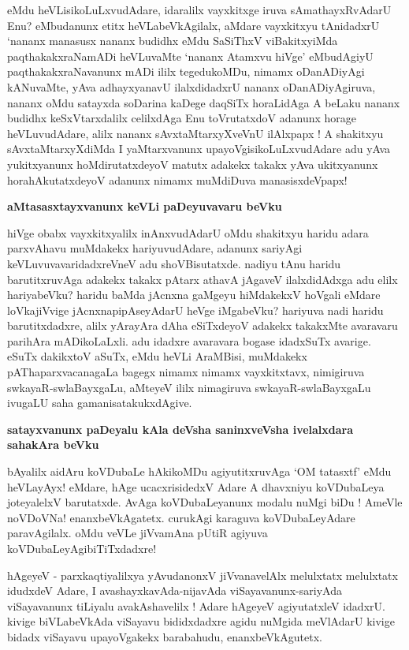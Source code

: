 \noindent
eMdu heVLisikoLuLxvudAdare, idaralilx vayxkitxge iruva sAmathayxRvAdarU 
Enu? eMbudanunx etitx heVLabeVkAgilalx, aMdare vayxkitxyu tAnidadxrU 
`nananx manasusx nananx budidhx eMdu SaSiThxV viBakitxyiMda 
paqthakakxraNamADi heVLuvaMte `nananx Atamxvu hiVge' eMbudAgiyU 
paqthakakxraNavanunx mADi ililx tegedukoMDu, nimamx oDanADiyAgi 
kANuvaMte, yAva adhayxyanavU ilalxdidadxrU nananx oDanADiyAgiruva, 
nananx oMdu satayxda soDarina kaDege daqSiTx horaLidAga A beLaku nananx budidhx keSxVtarxdalilx celilxdAga Enu toVrutatxdoV adanunx horage heVLuvudAdare, alilx nananx sAvxtaMtarxyXveVnU ilAlxpapx ! A shakitxyu sAvxtaMtarxyXdiMda I yaMtarxvanunx upayoVgisikoLuLxvudAdare adu yAva yukitxyanunx hoMdirutatxdeyoV matutx adakekx takakx yAva ukitxyanunx horahAkutatxdeyoV adanunx nimamx muMdiDuva manasisxdeVpapx!

{\bigskip
\noindent
{\large\bf aMtasasxtayxvanunx keVLi paDeyuvavaru beVku}}\label{page108a}
\medskip

\noindent
hiVge obabx vayxkitxyalilx inAnxvudAdarU oMdu shakitxyu haridu adara parxvAhavu muMdakekx hariyuvudAdare, adanunx sariyAgi keVLuvuvavaridadxreVneV adu shoVBisutatxde. nadiyu tAnu haridu barutitxruvAga adakekx takakx pAtarx athavA jAgaveV ilalxdidAdxga adu elilx hariyabeVku? haridu baMda jAcnxna gaMgeyu hiMdakekxV hoVgali eMdare loVkajiVvige jAcnxnapipAseyAdarU heVge iMgabeVku? hariyuva nadi haridu barutitxdadxre, alilx yArayAra dAha eSiTxdeyoV adakekx takakxMte avaravaru parihAra mADikoLaLxli. adu idadxre avaravara bogase idadxSuTx avarige. eSuTx dakikxtoV aSuTx, eMdu heVLi AraMBisi, muMdakekx pAThaparxvacanagaLa bagegx nimamx nimamx vayxkitxtavx, nimigiruva swkayaR-swlaBayxgaLu, aMteyeV ililx nimagiruva swkayaR-swlaBayxgaLu ivugaLU saha gamanisatakukxdAgive.

{\bigskip
\noindent
{\large\bf satayxvanunx paDeyalu kAla deVsha saninxveVsha ivelalxdara sahakAra beVku}}\label{page109}
\medskip

\noindent
bAyalilx aidAru koVDubaLe hAkikoMDu agiyutitxruvAga `OM tatasxtf' eMdu heVLayAyx! eMdare, hAge ucacxrisidedxV Adare A dhavxniyu koVDubaLeya joteyalelxV barutatxde. AvAga koVDubaLeyanunx modalu nuMgi biDu ! AmeVle noVDoVNa! enanxbeVkAgatetx. curukAgi karaguva koVDubaLeyAdare paravAgilalx. oMdu veVLe jiVvamAna pUtiR agiyuva koVDubaLeyAgibiTiTxdadxre!

hAgeyeV - parxkaqtiyalilxya yAvudanonxV jiVvanavelAlx melulxtatx melulxtatx idudxdeV Adare, I avashayxkavAda-nijavAda viSayavanunx-sariyAda viSayavanunx tiLiyalu avakAshavelilx ! Adare hAgeyeV agiyutatxleV idadxrU. kivige biVLabeVkAda viSayavu bididxdadxre agidu nuMgida meVlAdarU kivige bidadx viSayavu upayoVgakekx barabahudu, enanxbeVkAgutetx.

